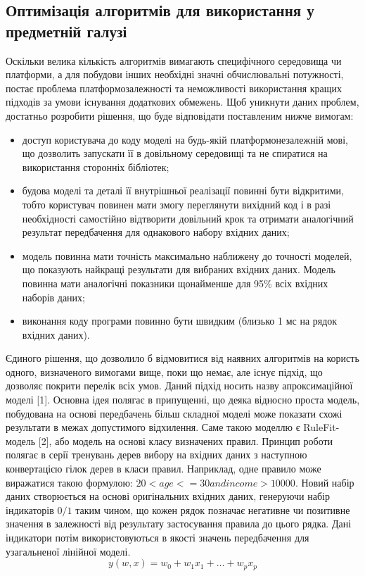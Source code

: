 \subsection{Оптимізація алгоритмів для використання у предметній галузі}
Оскільки велика кількість алгоритмів вимагають специфічного середовища чи платформи, а для побудови інших необхідні значні обчислювальні потужності, постає проблема платформозалежності та неможливості використання кращих підходів за умови існування додаткових обмежень. Щоб уникнути даних проблем, достатньо розробити рішення, що буде відповідати поставленим нижче вимогам:
\begin{itemize}  
	\item доступ користувача до коду моделі на будь-якій платформонезалежній мові, що дозволить запускати її в довільному середовищі та не спиратися на використання сторонніх бібліотек;
	\item будова моделі та деталі її внутрішньої реалізації повинні бути відкритими, тобто користувач повинен мати змогу переглянути вихідний код і в разі необхідності самостійно відтворити довільний крок та отримати аналогічний результат передбачення для однакового набору вхідних даних;
	\item модель повинна мати точність максимально наближену до точності моделей, що показують найкращі результати для вибраних вхідних даних. Модель повинна мати аналогічні показники щонайменше для 95\% всіх вхідних наборів даних;
	\item виконання коду програми повинно бути швидким (близько 1 мс на рядок вхідних даних).
\end{itemize}

Єдиного рішення, що дозволило б відмовитися від наявних алгоритмів на користь одного, визначеного вимогами вище, поки що немає, але існує підхід, що дозволяє покрити перелік всіх умов. Даний підхід носить назву апроксимаційної моделі [1]. Основна ідея полягає в припущенні, що деяка відносно проста модель, побудована на основі передбачень більш складної моделі може показати схожі результати в межах допустимого відхилення. Саме такою моделлю є RuleFit-модель [2], або модель на основі класу визначених правил. Принцип роботи полягає в серії тренувань дерев вибору на вхідних даних з наступною конвертацією гілок дерев в класи правил. Наприклад, одне правило може виражатися такою формулою: $20 < age <= 30 and income > 10000$. Новий набір даних створюється на основі оригінальних вхідних даних, генеруючи набір індикаторів $0/1$ таким чином, що кожен рядок позначає негативне чи позитивне значення в залежності від результату застосування правила до цього рядка. Дані індикатори потім використовуються в якості значень передбачення для узагальненої лінійної моделі.
\begin{equation}
    \label{eq:linear_model}
    y(w, x) = w_{0} + w_{1}x_{1} + \ldots + w_{p}x_{p}
\end{equation}

